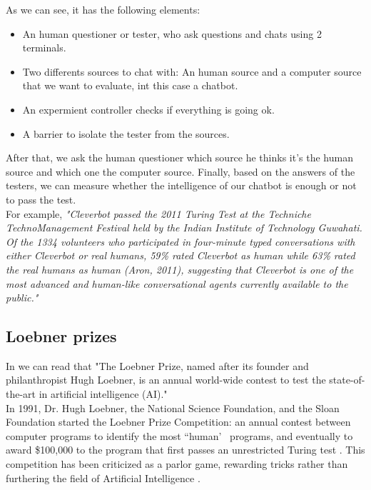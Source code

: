 \documentclass[12pt,twoside]{article}
\theoremstyle{plain}
\theoremstyle{definition}
\theoremstyle{remark}
\begin{document}
As we can see, it has the following elements:

\begin{itemize}
	\item An human questioner or tester, who ask questions and chats using 2 terminals.
	\item Two differents sources to chat with: An human source and a computer source that we want to evaluate, int this case a chatbot.
	\item An expermient controller checks if everything is going ok.
	\item A barrier to isolate the tester from the sources.
\end{itemize}

After that, we ask the human questioner which source he thinks it's the human source and which one the computer source. Finally, based on the answers of the testers, we can measure whether the intelligence of our chatbot is enough or not to pass the test.\\

For example, \textit{"Cleverbot passed the 2011 Turing Test at the Techniche TechnoManagement Festival held by the Indian Institute of Technology Guwahati. Of the 1334 volunteers who participated in four-minute typed conversations with either Cleverbot or real humans, 59\% rated Cleverbot as human while 63\% rated the real humans as human (Aron, 2011), suggesting that Cleverbot is one of the most advanced and human-like conversational agents currently available to the public."\cite{HILL2015245}}

\subsection{Loebner prizes}
	\label{sec:loebner}
	
	In \cite{loebner2011} we can read that "The Loebner Prize, named after its founder and philanthropist Hugh Loebner, is an annual world-wide contest to test the state-of-the-art in artificial intelligence (AI)."\\
	


	In 1991, Dr. Hugh Loebner, the National Science Foundation, and the Sloan Foundation started the Loebner Prize Competition: an annual contest between computer programs to identify the most “human’~ programs, and eventually to award \$100,000 to the program that first passes an unrestricted Turing test \cite{epstein1992quest}. This competition has been criticized as a parlor game, rewarding tricks rather than furthering the field of Artificial Intelligence \cite{shieber1994lessons}. \\
	
\end{document}
